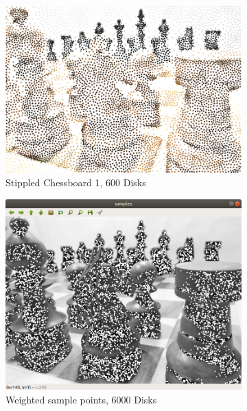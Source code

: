 \documentclass[11pt]{article}
\begin{document}
\begin{figure}[H]
\begin{subfigure}[b]{.48\linewidth}
		\includegraphics[width=\linewidth]{Chessboard-6000-1}
		\caption{Stippled Chessboard 1, 600 Disks}
		\label{fig:rfff3}
	\end{subfigure}
	\begin{subfigure}[b]{.48\linewidth}
		\includegraphics[width=\linewidth]{Chessboard-Points-2}
		\caption{Weighted sample points, 6000 Disks}
		\label{fig:rffdf2}
	\end{subfigure}
	\begin{subfigure}[b]{.48\linewidth}

\end{subfigure}
\end{figure}
\end{document}
